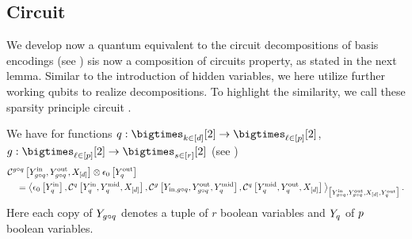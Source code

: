 

\subsection{Circuit \decompositionSparsity{}}

We develop now a quantum equivalent to the circuit decompositions of basis encodings (see ) sis now a composition of circuits property, as stated in the next lemma.
Similar to the introduction of hidden variables, we here utilize further working qubits to realize decompositions.
To highlight the similarity, we call these sparsity principle circuit \decompositionSparsity{}.

\begin{lemma}
    \label{lem:comCirDecSpar}
    We have for functions $\exfunction:\atomstates\rightarrow\bigtimes_{\selindexin}[2]$, $\secexfunction:\bigtimes_{\selindexin}[2]\rightarrow\bigtimes_{s\in[r]}[2]$ (see )
    \begin{align*}
        &\mathcal{C}^{g\circ q}\left[
            Y_{g\circ q}^{\mathrm{in}},
            Y_{g\circ q}^{\mathrm{out}},
            X_{[d]}\right]
        \otimes \epsilon_{0}\left[Y_{q}^{\mathrm{out}}\right] \\
        &\quad= \big\langle \epsilon_{0}\left[Y_{q}^{\mathrm{in}}\right],
            \mathcal{C}^{q}\left[Y_{q}^{\mathrm{in}},
                Y_{q}^{\mathrm{mid}},
                X_{[d]}\right],
            \mathcal{C}^{g}\left[
                Y_{\mathrm{in},g\circ q},
                Y_{g\circ q}^{\mathrm{out}},
                Y_{q}^{\mathrm{mid}}\right],
            \mathcal{C}^{q}\left[Y_{q}^{\mathrm{mid}},
                Y_{q}^{\mathrm{out}},
                X_{[d]}\right]
         \big\rangle_{\big[ 
            Y_{g\circ q}^{\mathrm{in}},Y_{g\circ q}^{\mathrm{out}},X_{[d]},Y_{q}^{\mathrm{out}}
         \big]} \, .
    \end{align*}
    Here each copy of $Y_{g\circ q}$ denotes a tuple of $r$ boolean variables and $Y_{q}$ of $p$ boolean variables.
\end{lemma}

